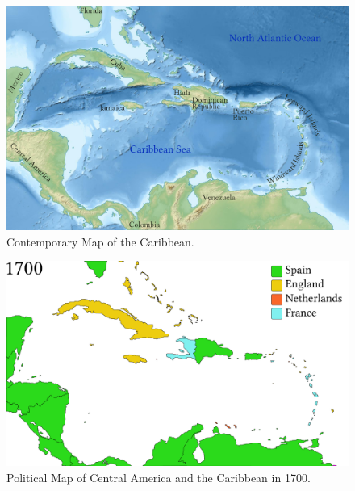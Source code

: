 \begin{figure}
\caption{\label{fig:key:3.3}  Contemporary Map of the Caribbean. 
}

 

\includegraphics[width=\textwidth]{figures/img3-base.pdf}
 
\end{figure}

\begin{figure}

 

\includegraphics[width=\textwidth]{figures/img4-base.pdf}

\caption{\label{fig:key:3.4} Political Map of Central America and the Caribbean in 1700. 
}
\end{figure}


